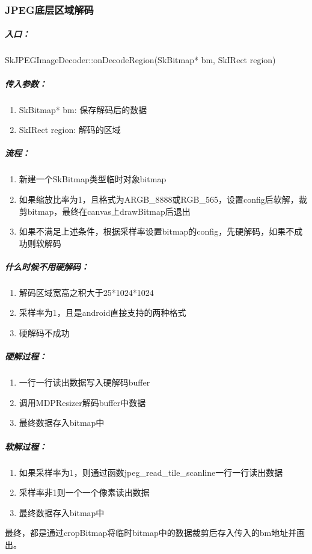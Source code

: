 \subsubsection{JPEG底层区域解码}
\label{sec:jpeg-region-decode}

\subparagraph{入口：}
SkJPEGImageDecoder::onDecodeRegion(SkBitmap* bm, SkIRect region)

\subparagraph{传入参数：}
  \begin{enumerate}
  \item SkBitmap* bm: 保存解码后的数据
  \item SkIRect region: 解码的区域
  \end{enumerate}

\subparagraph{流程：}
  \begin{enumerate}
  \item 新建一个SkBitmap类型临时对象bitmap
  \item 如果缩放比率为1，且格式为ARGB\_8888或RGB\_565，设置config后软解，裁剪bitmap，最终在canvas上drawBitmap后退出
  \item 如果不满足上述条件，根据采样率设置bitmap的config，先硬解码，如果不成功则软解码
  \end{enumerate}

\subparagraph{什么时候不用硬解码：}
  \begin{enumerate}
  \item 解码区域宽高之积大于25*1024*1024
  \item 采样率为1，且是android直接支持的两种格式
  \item 硬解码不成功
  \end{enumerate}

\subparagraph{硬解过程：}
  \begin{enumerate}
  \item 一行一行读出数据写入硬解码buffer
  \item 调用MDPResizer解码buffer中数据
  \item 最终数据存入bitmap中
  \end{enumerate}

\subparagraph{软解过程：}
  \begin{enumerate}
  \item 如果采样率为1，则通过函数jpeg\_read\_tile\_scanline一行一行读出数据
  \item 采样率非1则一个一个像素读出数据
  \item 最终数据存入bitmap中
  \end{enumerate}

最终，都是通过cropBitmap将临时bitmap中的数据裁剪后存入传入的bm地址并画出。

